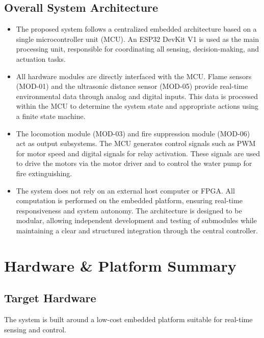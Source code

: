 \documentclass[12pt]{article}
\begin{document}
\subsection{Overall System Architecture}
\begin{itemize}
\item The proposed system follows a centralized embedded architecture based on a single microcontroller unit (MCU). An ESP32 DevKit V1 is used as the main processing unit, responsible for coordinating all sensing, decision-making, and actuation tasks.

\item All hardware modules are directly interfaced with the MCU. Flame sensors (MOD-01) and the ultrasonic distance sensor (MOD-05) provide real-time environmental data through analog and digital inputs. This data is processed within the MCU to determine the system state and appropriate actions using a finite state machine.

\item The locomotion module (MOD-03) and fire suppression module (MOD-06) act as output subsystems. The MCU generates control signals such as PWM for motor speed and digital signals for relay activation. These signals are used to drive the motors via the motor driver and to control the water pump for fire extinguishing.

\item The system does not rely on an external host computer or FPGA. All computation is performed on the embedded platform, ensuring real-time responsiveness and system autonomy. The architecture is designed to be modular, allowing independent development and testing of submodules while maintaining a clear and structured integration through the central controller.
\end{itemize}

\section{Hardware \& Platform Summary}

\subsection{Target Hardware}

The system is built around a low-cost embedded platform suitable for real-time sensing and control.
\end{document}
